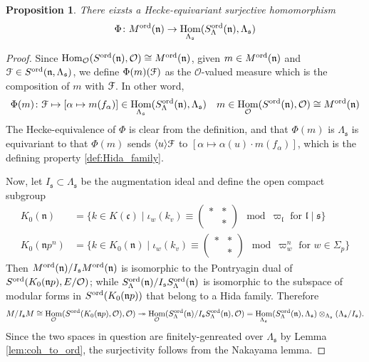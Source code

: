 \documentclass[leqno]{amsart}
\newcommand{\euF}{\EuScript{F}} %
\newcommand{\ord}{\textnormal{ord}}
\newcommand{\oo}{\mathcal{O}} %
\newcommand{\fc}{\mathfrak{c}}
\newcommand{\fs}{\mathfrak{s}}
\newcommand{\fn}{\mathfrak{n}}
\newcommand{\fl}{\mathfrak{l}}
\DeclareMathOperator{\Hom}{Hom}
\newtheorem{prop}[thm]{Proposition}
\theoremstyle{definition}
\theoremstyle{remark}
\begin{document}
\begin{prop}\label{prop:ord_to_dual}
	There eixsts a Hecke-equivariant surjective 
	homomorphism 
	\[
		\Phi\colon M^{\ord}(\fn)\to 
		\Hom_{\Lambda_{\fs}}
		(S_\Lambda^{\ord}(\fn),\Lambda_{\fs})
	\]
\end{prop}
\begin{proof}
Since $\Hom_\oo(S^{\ord}(\fn),\oo)\cong M^{\ord}(\fn)$,
given $m\in M^{\ord}(\fn)$ and
$\euF\in S^{\ord}(\fn,\Lambda_{\fs})$,
we define $\Phi(m)(\euF)$ as the 
$\oo$-valued measure which is the composition
of $m$ with  $\euF$.
In other word, 
\begin{equation}
	\Phi(m)\colon \euF\mapsto
	[\alpha\mapsto m(f_\alpha)]
	\in \Hom_{\Lambda_{\fs}}
	(S_\Lambda^{\ord}(\fn),\Lambda_{\fs})\quad
	m\in \Hom_\oo(S^{\ord}(\fn),\oo)\cong M^{\ord}(\fn)
\end{equation}
The Hecke-equivalence of $\Phi$
is clear from the definition,
and that $\Phi(m)$ is $\Lambda_{\fs}$
is equivariant to that 
$\Phi(m)$ sends $\langle u\rangle \euF$
to $[\alpha\mapsto \alpha(u)\cdot m(f_\alpha)]$,
which is the defining property \eqref{def:Hida_family}.

Now, let $I_\fs\subset\Lambda_{\fs}$ be the augmentation ideal
and define the open compact subgroup
\begin{align*}
	K_0(\fn)&=
	\{
	k\in K(\fc)\mid
	\iota_{w}(k_v)\equiv
	(\begin{smallmatrix}
		*&*\\&*
	\end{smallmatrix})\mod \varpi_\fl
	\text{ for } \fl\mid \fs
	\}\\
	K_0(\fn p^n)&=
	\{
	k\in K_0(\fn)\mid
	\iota_{w}(k_v)\equiv
	(\begin{smallmatrix}
		*&*\\&*
	\end{smallmatrix})\mod \varpi_w^n
	\text{ for } w\in \Sigma_p
	\}
\end{align*}
Then $M^{\ord}(\fn)/I_\fs M^{\ord}(\fn)$
is isomorphic to the Pontryagin dual
of $S^{\ord}(K_0(\fn p),E/\oo)$;
while $S^{\ord}_\Lambda(\fn)/I_\fs S^{\ord}_\Lambda(\fn)$
is isomorphic to the subspace 
of modular forms in $S^{\ord}(K_0(\fn p))$ that belong
to a Hida family. Therefore
\[
	M/I_{\fs}M\cong \Hom_{\oo}(S^{\ord}(K_0(\fn p),\oo)
	,\oo) \twoheadrightarrow \Hom_{\oo} 
	(S_\Lambda^{\ord}(\fn)/I_\fs S_\Lambda^{\ord}(\fn)
	,\oo)
	=\Hom_{\Lambda_{\fs}} 
	(S_\Lambda^{\ord}(\fn),\Lambda_{\fs})
	\otimes_{\Lambda_{\fs}}(\Lambda_{\fs}/I_{\fs}).
\]
Since the two spaces in question
are finitely-genreated over $\Lambda_{\fs}$
by Lemma \ref{lem:coh_to_ord},
the surjectivity follows from the Nakayama lemma.
\end{proof}
\end{document}
